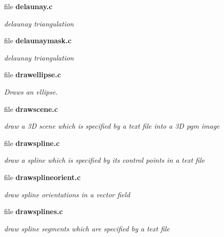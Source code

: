 \begin{CompactItemize}
\item 
file \bf{delaunay.c}
\begin{CompactList}\small\item\em delaunay triangulation \item\end{CompactList}

\item 
file \bf{delaunaymask.c}
\begin{CompactList}\small\item\em delaunay triangulation \item\end{CompactList}

\item 
file \bf{drawellipse.c}
\begin{CompactList}\small\item\em Draws an ellipse. \item\end{CompactList}

\item 
file \bf{drawscene.c}
\begin{CompactList}\small\item\em draw a 3D scene which is specified by a text file into a 3D pgm image \item\end{CompactList}

\item 
file \bf{drawspline.c}
\begin{CompactList}\small\item\em draw a spline which is specified by its control points in a text file \item\end{CompactList}

\item 
file \bf{drawsplineorient.c}
\begin{CompactList}\small\item\em draw spline orientations in a vector field \item\end{CompactList}

\item 
file \bf{drawsplines.c}
\begin{CompactList}\small\item\em draw spline segments which are specified by a text file \item\end{CompactList}


\end{CompactItemize}
